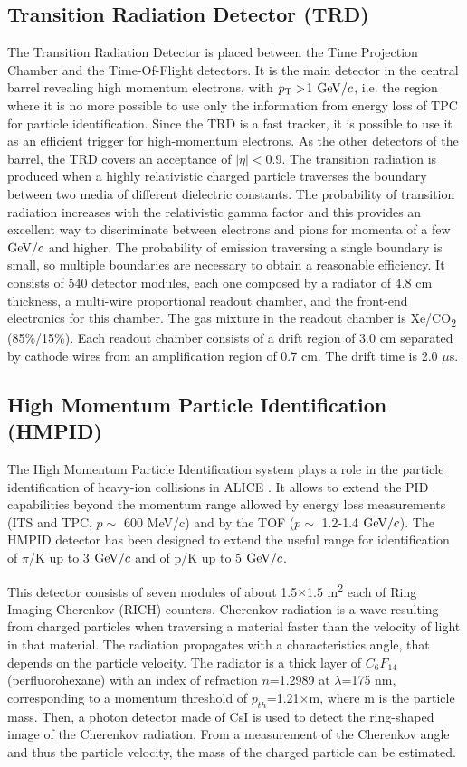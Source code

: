 \iffalse
\subsection{Transition Radiation Detector (TRD)}
The Transition Radiation Detector \cite{TRD-TDR} is placed between the
 Time Projection Chamber and the Time-Of-Flight detectors. It is the main 
 detector in the central barrel revealing high momentum electrons, with $p_{\rm T} >$1 $\mathrm{GeV}/c$, 
 i.e. the region where it is no more possible to use only the information from 
 energy loss of TPC for particle identification. Since the TRD is a fast tracker, 
 it is possible to use it as an efficient trigger for high-momentum electrons. 
 As the other detectors of the barrel, the TRD covers an acceptance of $|\eta|<$0.9.
The transition radiation is produced when a highly relativistic charged particle 
traverses the boundary between two media of different dielectric constants. 
The probability of transition radiation increases with the relativistic gamma factor 
and this provides an excellent way to discriminate between electrons and pions for
 momenta of a few $\mathrm{GeV}/c$ and higher. The probability of emission traversing 
 a single boundary is small, so multiple boundaries are necessary to obtain a reasonable efficiency.
It consists of 540 detector modules, each one composed by a radiator of 4.8 cm 
thickness, a multi-wire proportional readout chamber, and the front-end electronics
 for this chamber. The gas mixture in the readout chamber is Xe/CO\textsubscript{2} 
 (85\%/15\%). Each readout chamber consists of a drift region of 3.0 cm separated 
 by cathode wires from an amplification region of 0.7 cm. The drift time is 2.0 $\mu$s.



\subsection{High Momentum Particle Identification (HMPID)}
The High Momentum Particle Identification system plays a role in the particle
 identification of heavy-ion collisions in ALICE \cite{HMPID-TDR}. It allows to extend
  the PID capabilities beyond the momentum range allowed by energy loss measurements 
  (ITS and TPC, $p \sim$ 600 MeV/c) and by the TOF ($p \sim$ 1.2-1.4 $\mathrm{GeV}/c$). 
  The HMPID detector has been designed to extend the useful range for identification of 
  $\pi$/K up to 3 $\mathrm{GeV}/c$ and of p/K up to 5 $\mathrm{GeV}/c$. 


This detector consists of seven modules of about 1.5$\times$1.5 m\textsuperscript{2} 
each of Ring Imaging Cherenkov (RICH) counters. Cherenkov radiation is a wave resulting
 from charged particles when traversing a material faster than the velocity of light in that 
 material. The radiation propagates with a characteristics angle, that depends on the particle 
 velocity. The radiator is a thick layer of $C_6F_{14}$ (perfluorohexane) with an index of 
 refraction $n$=1.2989 at $\lambda$=175 nm, corresponding to a momentum threshold 
 of $p_{th}$=1.21$\times$m, where m is the particle mass. Then, a photon detector made 
 of CsI is used to detect the ring-shaped image of the Cherenkov radiation. From a 
 measurement of the Cherenkov angle and thus the particle velocity, the mass of the charged particle can be estimated.

